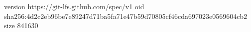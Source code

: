 version https://git-lfs.github.com/spec/v1
oid sha256:4d2c2eb96be7e89247d71ba5fa71e47b59d70805cf46cda697023e0569604cb2
size 841630
